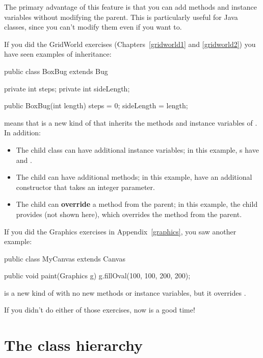 The primary advantage of this feature is that you can add methods and instance variables without modifying the parent.
This is particularly useful for Java classes, since you can't modify them even if you want to.

If you did the GridWorld exercises (Chapters~\ref{gridworld1} and \ref{gridworld2}) you have seen examples of inheritance:

\begin{code}
public class BoxBug extends Bug {
    private int steps;
    private int sideLength;

    public BoxBug(int length) {
        steps = 0;
        sideLength = length;
    }
}
\end{code}

 means that  is a new kind of  that inherits the methods and instance variables of .
In addition:

\begin{itemize}

\item The child class can have additional instance variables; in this example, s have  and .

\item The child can have additional methods; in this example,  have an additional constructor that takes an integer parameter.

\item The child can {\bf override} a method from the parent; in this example, the child provides  (not shown here), which overrides the  method from the parent.

\end{itemize}

If you did the Graphics exercises in Appendix~\ref{graphics}, you saw another example:

\begin{code}
public class MyCanvas extends Canvas {

    public void paint(Graphics g) {
        g.fillOval(100, 100, 200, 200);
    }
}
\end{code}

 is a new kind of  with no new methods or instance variables, but it overrides .

If you didn't do either of those exercises, now is a good time!


\section{The class hierarchy}

